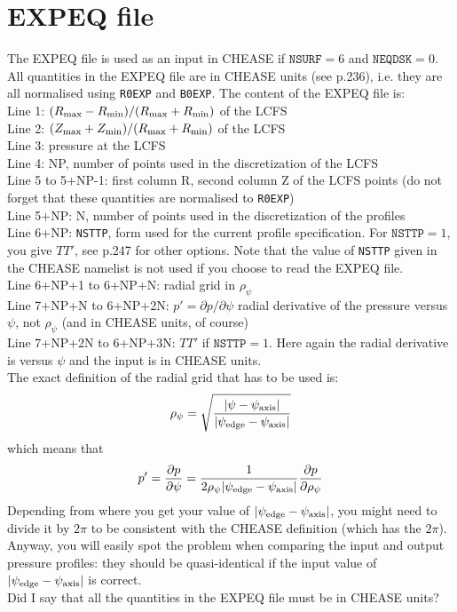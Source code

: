 \documentclass[a4paper,12pt]{article}
\newcommand{\ind}[1]{\ensuremath{_{\rm{#1}}}}
\begin{document}
\section{EXPEQ file}
The EXPEQ file is used as an input in  CHEASE if $\texttt{NSURF}=6$ and $\texttt{NEQDSK}=0$. All quantities in the EXPEQ file are in CHEASE units (see \cite{Lutjens:Comput1996} p.236), i.e.
they are all normalised using \texttt{R0EXP} and \texttt{B0EXP}. The content of the EXPEQ file is:\\
Line 1: $(R\ind{max}-R\ind{min})/(R\ind{max}+R\ind{min})$ of the LCFS\\
Line 2: $(Z\ind{max}+Z\ind{min})/(R\ind{max}+R\ind{min})$ of the LCFS\\
Line 3: pressure at the LCFS\\
Line 4: NP, number of points used in the discretization of the LCFS\\
Line 5 to 5+NP-1: first column R, second column Z of the LCFS points (do not forget that these quantities are normalised to \texttt{R0EXP})\\
Line 5+NP: N, number of points used in the discretization of the profiles\\
Line 6+NP: \texttt{NSTTP}, form used for the current profile specification. For $\texttt{NSTTP}=1$, you give $TT'$, see \cite{Lutjens:Comput1996} p.247 for other options. Note that the value of
\texttt{NSTTP} given in the CHEASE namelist is not used if you choose to read the EXPEQ file.\\
Line 6+NP+1 to 6+NP+N: radial grid in $\rho_\psi$\\
Line 7+NP+N to 6+NP+2N: $p'=\partial p/\partial \psi$ radial derivative of the pressure versus $\psi$, not $\rho_\psi$ (and in CHEASE units, of course)\\
Line 7+NP+2N to 6+NP+3N: $TT'$ if $\texttt{NSTTP}=1$. Here again the radial derivative is versus $\psi$ and the input is in CHEASE units.\\
The exact definition of the radial grid that has to be used is:
$$\rho_\psi=\sqrt{\frac{|\psi-\psi\ind{axis}|}{|\psi\ind{edge}-\psi\ind{axis}|}}$$
which means that 
$$p'=\frac{\partial p}{\partial \psi} = \frac{1}{2\rho_\psi|\psi\ind{edge}-\psi\ind{axis}|}\frac{\partial p}{\partial \rho_\psi}$$ 
Depending from where you get your value of $|\psi\ind{edge}-\psi\ind{axis}|$, you might need to divide it by $2\pi$ to be consistent with the CHEASE definition (which has the $2\pi$). Anyway, you will
easily spot the problem when comparing the input and output pressure profiles: they should be quasi-identical if the input value of $|\psi\ind{edge}-\psi\ind{axis}|$ is correct.\\
Did I say that all the quantities in the EXPEQ file must be in CHEASE units?
\end{document}
